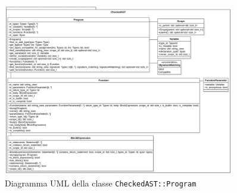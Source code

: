 \begin{figure}[H]
	\centering
	\includegraphics[width=0.9\textwidth]{figures/checked_ast_program.png}
	\caption{Diagramma UML della classe \texttt{CheckedAST::Program}}
	\label{fig:checked-ast-program-uml}
\end{figure}

